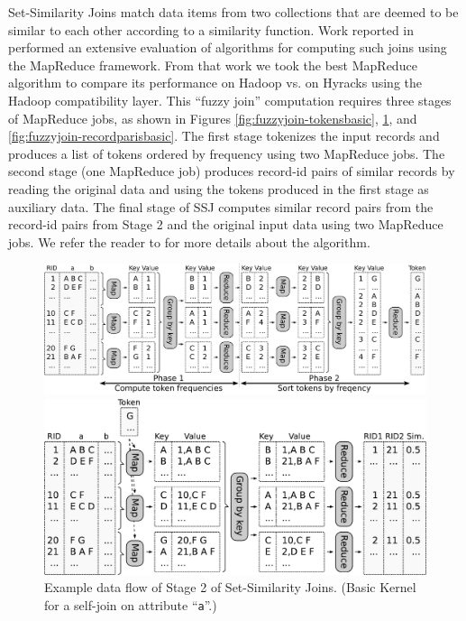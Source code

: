 Set-Similarity Joins match data items from two collections that are deemed to be similar to each other according to a similarity function. Work reported in \cite{FuzzyJoinMR}
performed an extensive evaluation of algorithms for computing such joins using the MapReduce framework. From that work we took the best MapReduce algorithm to compare
its performance on Hadoop vs. on Hyracks using the Hadoop compatibility layer. This ``fuzzy join'' computation requires three stages of MapReduce jobs, as shown in Figures
\ref{fig:fuzzyjoin-tokensbasic}, \ref{fig:fuzzyjoin-ridparisimporved}, and \ref{fig:fuzzyjoin-recordparisbasic}.
The first stage tokenizes the input records and produces a list of tokens ordered by frequency using two MapReduce jobs. The second stage (one MapReduce job) produces
record-id pairs of similar records by reading the original data and using the tokens produced in the first stage as auxiliary data. The final stage of SSJ computes
similar record pairs from the record-id pairs from Stage 2 and the original input data using two MapReduce jobs.
We refer the reader to \cite{FuzzyJoinMR} for more details about the algorithm.

\begin{figure}
    \center
    \includegraphics[scale=0.7]{images/fuzzyjoin-tokensbasic}
    \caption{Example data flow of Stage 1 of Set-Similarity
      Joins. (Basic Token ordering for a self-join on attribute
      ``\texttt{a}''.)}
    \label{fig:fuzzyjoin-tokensbasic}

    \center
    \includegraphics[scale=0.7]{images/fuzzyjoin-ridpairsimproved}
    \caption{Example data flow of Stage 2 of Set-Similarity
      Joins. (Basic Kernel for a self-join on attribute ``\texttt{a}''.)}
    \label{fig:fuzzyjoin-ridparisimporved}
\end{figure}


